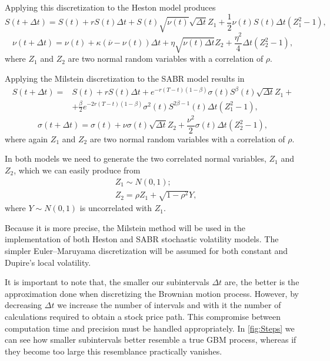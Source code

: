 Applying this discretization to the Heston model produces
\begin{equation}
S(t+\Delta t)=S(t)+rS(t)\Delta t+S(t)\sqrt{\nu(t)}\sqrt{\Delta t}Z_1+\frac{1}{2}\nu(t)S(t)\Delta t(Z_1^2-1),
\end{equation}
\begin{equation}
\nu(t+\Delta t)=\nu(t)+\kappa(\overline{\nu}-\nu(t))\Delta t+\eta\sqrt{\nu(t)\Delta t}Z_2+\frac{\eta^2}{4}\Delta t(Z_2^2-1),
\end{equation}
\noindent where $Z_1$ and $Z_2$ are two normal random variables with a correlation of $\rho$.


Applying the Milstein discretization to the SABR model results in
\begin{equation}
\begin{split}
S(t+\Delta t)=&S(t)+rS(t)\Delta t+e^{-r(T-t)(1-\beta)}\sigma(t)S^\beta(t)\sqrt{\Delta t}Z_1+\\
&+\frac{\beta}{2}e^{-2r(T-t)(1-\beta)}\sigma^2(t)S^{2\beta-1}(t)\Delta t(Z_1^2-1),
\end{split}
\end{equation}
\begin{equation}
\sigma(t+\Delta t)=\sigma(t)+\nu\sigma(t)\sqrt{\Delta t}Z_2+\frac{\nu^2}{2}\sigma(t)\Delta t(Z_2^2-1),
\end{equation}
\noindent where again $Z_1$ and $Z_2$ are two normal random variables with a correlation of $\rho$.

In both models we need to generate the two correlated normal variables, $Z_1$ and $Z_2$, which we can easily produce from
\begin{equation}\label{normcorr}
\begin{split}
&Z_1\sim N(0,1);\\
&Z_2=\rho Z_1+\sqrt{1-\rho^2}Y,
\end{split}
\end{equation}
\noindent where $Y\sim N(0,1)$ is uncorrelated with $Z_1$.

Because it is more precise, the Milstein method will be used in the implementation of both Heston and SABR stochastic volatility models. The simpler Euler–Maruyama discretization will be assumed for both constant and Dupire's local volatility.

It is important to note that, the smaller our subintervals $\Delta t$ are, the better is the approximation done when discretizing the Brownian motion process. However, by decreasing $\Delta t$ we increase the number of intervals and with it the number of calculations required to obtain a stock price path. This compromise between computation time and precision must be handled appropriately.
In \autoref{fig:Steps} we can see how smaller subintervals better resemble a true GBM process, whereas if they become too large this resemblance practically vanishes.

